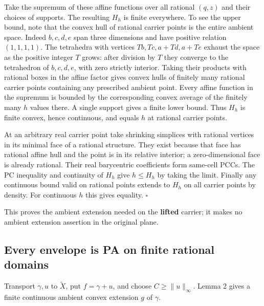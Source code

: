 \documentclass[
  11pt,
]{article}
\begin{document}
Take the supremum of these affine functions over all rational \((q,z)\)
and their choices of supports. The resulting \(H_h\) is finite
everywhere. To see the upper bound, note that the convex hull of
rational carrier points is the entire ambient space. Indeed \(b,c,d,e\)
span three dimensions and have positive relation \((1,1,1,1)\). The
tetrahedra with vertices \(Tb,Tc,a+Td,a+Te\) exhaust the space as the
positive integer \(T\) grows: after division by \(T\) they converge to
the tetrahedron of \(b,c,d,e\), with zero strictly interior. Taking
their products with rational boxes in the affine factor gives convex
hulls of finitely many rational carrier points containing any prescribed
ambient point. Every affine function in the supremum is bounded by the
corresponding convex average of the finitely many \(h\) values there. A
single support gives a finite lower bound. Thus \(H_h\) is finite
convex, hence continuous, and equals \(h\) at rational carrier points.

At an arbitrary real carrier point take shrinking simplices with
rational vertices in its minimal face of a rational structure. They
exist because that face has rational affine hull and the point is in its
relative interior; a zero-dimensional face is already rational. Their
real barycentric coefficients form same-cell PCCs. The PC inequality and
continuity of \(H_h\) give \(h\leq H_h\) by taking the limit. Finally
any continuous bound valid on rational points extends to \(H_h\) on all
carrier points by density. For continuous \(h\) this gives equality.
\(\square\)

This proves the ambient extension needed on the \textbf{lifted} carrier;
it makes no ambient extension assertion in the original plane.

\subsection{Every envelope is PA on finite rational
domains}\label{every-envelope-is-pa-on-finite-rational-domains}

Transport \(\gamma,u\) to \(\widetilde X\), put \(f=\gamma+u\), and
choose \(C\geq\|u\|_\infty\). Lemma 2 gives a finite continuous ambient
convex extension \(g\) of \(\gamma\).
\end{document}
